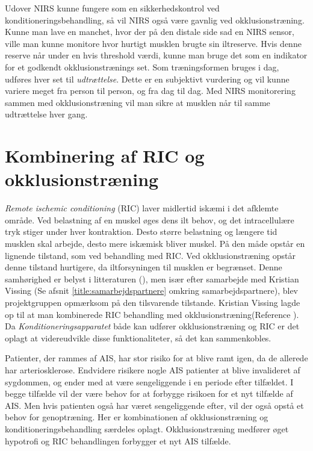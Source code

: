 Udover NIRS kunne fungere som en sikkerhedskontrol ved konditioneringsbehandling, så vil NIRS også være gavnlig ved okklusionstræning. Kunne man lave en manchet, hvor der på den distale side sad en NIRS sensor, ville man kunne monitore hvor hurtigt musklen brugte sin iltreserve. Hvis denne reserve når under en hvis threshold værdi, kunne man bruge det som en indikator for et godkendt okklusionstrænings set. Som træningsformen bruges i dag, udføres hver set til \textit{udtrættelse}. Dette er en subjektivt vurdering og vil kunne variere meget fra person til person, og fra dag til dag. Med NIRS monitorering sammen med okklusionstræning vil man sikre at musklen når til samme udtrættelse hver gang. 

\section{Kombinering af RIC og okklusionstræning} \label{title:kombRICogOkkl}
\textit{Remote ischemic conditioning} (RIC) laver midlertid iskæmi i det afklemte område. Ved belastning af en muskel øges dens ilt behov, og det intracellulære tryk stiger under hver kontraktion. Desto større belastning og længere tid musklen skal arbejde, desto mere iskæmisk bliver muskel. På den måde opstår en lignende tilstand, som ved behandling med RIC. Ved okklusionstræning opstår denne tilstand hurtigere, da iltforsyningen til musklen er begrænset. Denne samhørighed er belyst i litteraturen (\cite{RefWorks:3}), men især efter samarbejde med Kristian Vissing (Se afsnit \ref{title:samarbejdspartnere} omkring samarbejdspartnere), blev projektgruppen opmærksom på den tilsvarende tilstande. Kristian Vissing lagde op til at man kombinerede RIC behandling med okklusionstræning(Reference ). Da \textit{Konditioneringsapparatet} både kan udfører okklusionstræning og RIC er det oplagt at videreudvikle disse funktionaliteter, så det kan sammenkobles. 

Patienter, der rammes af AIS, har stor risiko for at blive ramt igen, da de allerede har arteriosklerose. Endvidere risikere nogle AIS patienter at blive invalideret af sygdommen, og ender med at være sengeliggende i en periode efter tilfældet. I begge tilfælde vil der være behov for at forbygge risikoen for et nyt tilfælde af AIS. Men hvis patienten også har været sengeliggende efter, vil der også opstå et behov for genoptræning. Her er kombinationen af okklusionstræning og konditioneringsbehandling særdeles oplagt. Okklusionstræning medfører øget hypotrofi og RIC behandlingen forbygger et nyt AIS tilfælde.   

